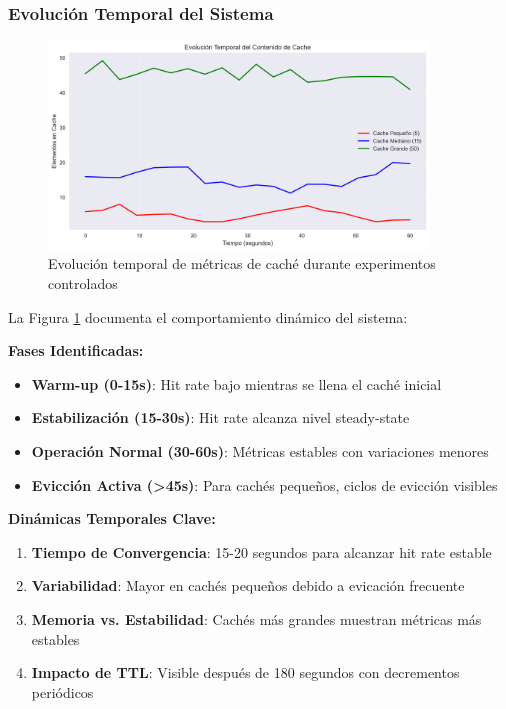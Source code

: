 \documentclass[12pt,a4paper]{article}
\begin{document}
\subsubsection{Evolución Temporal del Sistema}

\begin{figure}[H]
\centering
\includegraphics[width=0.9\textwidth]{cache_temporal_evolution.png}
\caption{Evolución temporal de métricas de caché durante experimentos controlados}
\label{fig:cache_temporal}
\end{figure}

La Figura \ref{fig:cache_temporal} documenta el comportamiento dinámico del sistema:

\textbf{Fases Identificadas:}
\begin{itemize}
\item \textbf{Warm-up (0-15s)}: Hit rate bajo mientras se llena el caché inicial
\item \textbf{Estabilización (15-30s)}: Hit rate alcanza nivel steady-state
\item \textbf{Operación Normal (30-60s)}: Métricas estables con variaciones menores
\item \textbf{Evicción Activa (>45s)}: Para cachés pequeños, ciclos de evicción visibles
\end{itemize}

\textbf{Dinámicas Temporales Clave:}
\begin{enumerate}
\item \textbf{Tiempo de Convergencia}: 15-20 segundos para alcanzar hit rate estable
\item \textbf{Variabilidad}: Mayor en cachés pequeños debido a evicación frecuente
\item \textbf{Memoria vs. Estabilidad}: Cachés más grandes muestran métricas más estables
\item \textbf{Impacto de TTL}: Visible después de 180 segundos con decrementos periódicos
\end{enumerate}
\end{document}
